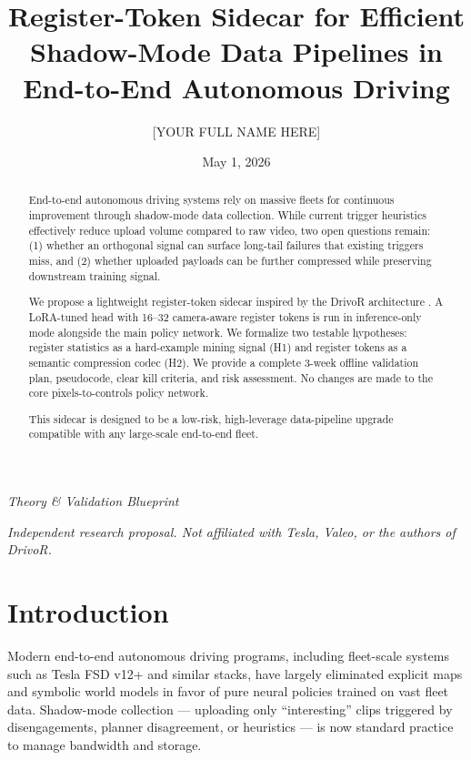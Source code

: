 \documentclass[11pt]{article}
\title{\textbf{Register-Token Sidecar for Efficient Shadow-Mode Data Pipelines in End-to-End Autonomous Driving}}
\author{[YOUR FULL NAME HERE]}
\date{May 1, 2026}
\begin{document}
\maketitle
\thispagestyle{empty}

\begin{center}
\small
\textit{Theory \& Validation Blueprint}

\textit{Independent research proposal. Not affiliated with Tesla, Valeo, or the authors of DrivoR.}
\end{center}

\begin{abstract}
End-to-end autonomous driving systems rely on massive fleets for continuous improvement through shadow-mode data collection. While current trigger heuristics effectively reduce upload volume compared to raw video, two open questions remain: (1) whether an orthogonal signal can surface long-tail failures that existing triggers miss, and (2) whether uploaded payloads can be further compressed while preserving downstream training signal.

We propose a lightweight register-token sidecar inspired by the DrivoR architecture \cite{kirby2026drivor}. A LoRA-tuned head with 16--32 camera-aware register tokens is run in inference-only mode alongside the main policy network. We formalize two testable hypotheses: register statistics as a hard-example mining signal (H1) and register tokens as a semantic compression codec (H2). We provide a complete 3-week offline validation plan, pseudocode, clear kill criteria, and risk assessment. No changes are made to the core pixels-to-controls policy network.

This sidecar is designed to be a low-risk, high-leverage data-pipeline upgrade compatible with any large-scale end-to-end fleet.
\end{abstract}

\section{Introduction}

Modern end-to-end autonomous driving programs, including fleet-scale systems such as Tesla FSD v12+ and similar stacks, have largely eliminated explicit maps and symbolic world models in favor of pure neural policies trained on vast fleet data. Shadow-mode collection --- uploading only ``interesting'' clips triggered by disengagements, planner disagreement, or heuristics --- is now standard practice to manage bandwidth and storage.
\end{document}

